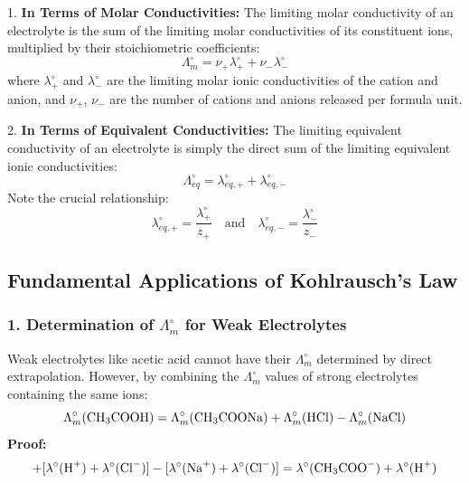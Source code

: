 \begin{conceptbox}
1. \textbf{In Terms of Molar Conductivities:}
The limiting molar conductivity of an electrolyte is the sum of the limiting molar conductivities of its constituent ions, multiplied by their stoichiometric coefficients:
\begin{equation}
    \boxed{\Lambda_m^\circ = \nu_+ \lambda_+^\circ + \nu_- \lambda_-^\circ}
\end{equation}
where $\lambda_+^\circ$ and $\lambda_-^\circ$ are the limiting molar ionic conductivities of the cation and anion, and $\nu_+$, $\nu_-$ are the number of cations and anions released per formula unit.

2. \textbf{In Terms of Equivalent Conductivities:}
The limiting equivalent conductivity of an electrolyte is simply the direct sum of the limiting equivalent ionic conductivities:
\begin{equation}
    \boxed{\Lambda_{eq}^\circ = \lambda_{eq,+}^\circ + \lambda_{eq,-}^\circ}
\end{equation}
Note the crucial relationship:
\begin{equation}
    \lambda_{eq,+}^\circ = \frac{\lambda_+^\circ}{z_+} \quad \text{and} \quad \lambda_{eq,-}^\circ = \frac{\lambda_-^\circ}{z_-}
\end{equation}
\end{conceptbox}

\subsection{Fundamental Applications of Kohlrausch's Law}

\subsubsection{1. Determination of $\Lambda_m^\circ$ for Weak Electrolytes}
Weak electrolytes like acetic acid cannot have their $\Lambda_m^\circ$ determined by direct extrapolation. However, by combining the $\Lambda_m^\circ$ values of strong electrolytes containing the same ions:
\begin{equation}
    \Lambda_m^\circ(\ce{CH3COOH}) = \Lambda_m^\circ(\ce{CH3COONa}) + \Lambda_m^\circ(\ce{HCl}) - \Lambda_m^\circ(\ce{NaCl})
\end{equation}
\textbf{Proof:}
\begin{align*}
    [\lambda^\circ(\ce{CH3COO-}) + \lambda^\circ(\ce{Na+})] + [\lambda^\circ(\ce{H+}) + \lambda^\circ(\ce{Cl-})] - [\lambda^\circ(\ce{Na+}) + \lambda^\circ(\ce{Cl-})] = \lambda^\circ(\ce{CH3COO-}) + \lambda^\circ(\ce{H+})
\end{align*}


